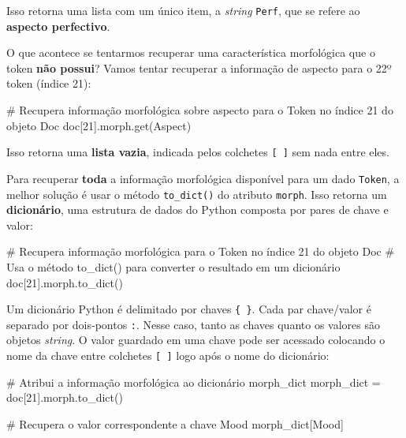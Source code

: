 \documentclass[
  brazilian,
  11pt,
]{article}
\newenvironment{Shaded}{\begin{snugshade}}{\end{snugshade}}
\newcommand{\CommentTok}[1]{\textcolor[rgb]{0.48,0.49,0.49}{#1}}
\newcommand{\DecValTok}[1]{\textcolor[rgb]{0.96,0.45,0.00}{#1}}
\newcommand{\NormalTok}[1]{\textcolor[rgb]{0.81,0.81,0.76}{#1}}
\newcommand{\OperatorTok}[1]{\textcolor[rgb]{0.81,0.81,0.76}{#1}}
\newcommand{\StringTok}[1]{\textcolor[rgb]{0.96,0.31,0.31}{#1}}
\let\oldtexttt\texttt
\renewcommand{\texttt}[1]{{\color{inlink}\oldtexttt{#1}}}
\begin{document}
Isso retorna uma lista com um único item, a \emph{string} \texttt{Perf},
que se refere ao \textbf{aspecto perfectivo}.

O que acontece se tentarmos recuperar uma característica morfológica que
o token \textbf{não possui}? Vamos tentar recuperar a informação de
aspecto para o 22º token (índice 21):

\begin{Shaded}
\begin{Highlighting}[]
\CommentTok{\# Recupera informação morfológica sobre aspecto para o Token no índice 21 do objeto Doc}
\NormalTok{doc[}\DecValTok{21}\NormalTok{].morph.get(}\StringTok{\textquotesingle{}Aspect\textquotesingle{}}\NormalTok{)}
\end{Highlighting}
\end{Shaded}

Isso retorna uma \textbf{lista vazia}, indicada pelos colchetes
\texttt{{[}\ {]}} sem nada entre eles.

Para recuperar \textbf{toda} a informação morfológica disponível para um
dado \texttt{Token}, a melhor solução é usar o método
\texttt{to\_dict()} do atributo \texttt{morph}. Isso retorna um
\textbf{dicionário}, uma estrutura de dados do Python composta por pares
de chave e valor:

\begin{Shaded}
\begin{Highlighting}[]
\CommentTok{\# Recupera informação morfológica para o Token no índice 21 do objeto Doc}
\CommentTok{\# Usa o método to\_dict() para converter o resultado em um dicionário}
\NormalTok{doc[}\DecValTok{21}\NormalTok{].morph.to\_dict()}
\end{Highlighting}
\end{Shaded}

Um dicionário Python é delimitado por chaves \texttt{\{\ \}}. Cada par
chave/valor é separado por dois‑pontos \texttt{:}. Nesse caso, tanto as
chaves quanto os valores são objetos \emph{string}. O valor guardado em
uma chave pode ser acessado colocando o nome da chave entre colchetes
\texttt{{[}\ {]}} logo após o nome do dicionário:

\begin{Shaded}
\begin{Highlighting}[]
\CommentTok{\# Atribui a informação morfológica ao dicionário \textquotesingle{}morph\_dict\textquotesingle{}}
\NormalTok{morph\_dict }\OperatorTok{=}\NormalTok{ doc[}\DecValTok{21}\NormalTok{].morph.to\_dict()}

\CommentTok{\# Recupera o valor correspondente a chave \textquotesingle{}Mood\textquotesingle{}}
\NormalTok{morph\_dict[}\StringTok{\textquotesingle{}Mood\textquotesingle{}}\NormalTok{]}
\end{Highlighting}
\end{Shaded}
\end{document}
